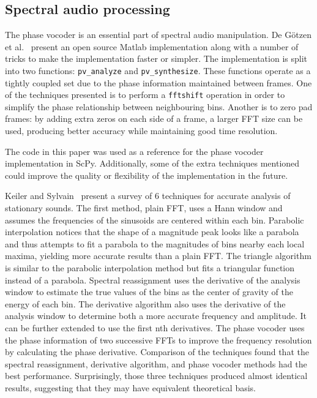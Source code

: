 \documentclass{article}
\begin{document}
\subsection{Spectral audio processing}

The phase vocoder is an essential part of spectral audio manipulation. De G{\"o}tzen et
al.~\cite{de2000traditional} present an open source Matlab implementation along with a number of
tricks to make the implementation faster or simpler. The implementation is split into two
functions: \texttt{pv\_analyze} and \texttt{pv\_synthesize}. These functions operate as a tightly
coupled set due to the phase information maintained between frames. One of the techniques presented
is to perform a \texttt{fftshift} operation in order to simplify the phase relationship between
neighbouring bins. Another is to zero pad frames: by adding extra zeros on each side of a frame, a
larger FFT size can be used, producing better accuracy while maintaining good time resolution.

The code in this paper was used as a reference for the phase vocoder implementation in ScPy.
Additionally, some of the extra techniques mentioned could improve the quality or flexibility of
the implementation in the future.

Keiler and Sylvain~\cite{keiler2002survey} present a survey of 6 techniques for accurate analysis
of stationary sounds. The first method, plain FFT, uses a Hann window and assumes the frequencies
of the sinusoids are centered within each bin. Parabolic interpolation notices that the shape of a
magnitude peak looks like a parabola and thus attempts to fit a parabola to the magnitudes of bins
nearby each local maxima, yielding more accurate results than a plain FFT\@. The triangle algorithm
is similar to the parabolic interpolation method but fits a triangular function instead of a
parabola. Spectral reassignment uses the derivative of the analysis window to estimate the true
values of the bins as the center of gravity of the energy of each bin. The derivative algorithm
also uses the derivative of the analysis window to determine both a more accurate frequency and
amplitude. It can be further extended to use the first nth derivatives. The phase vocoder uses the
phase information of two successive FFTs to improve the frequency resolution by calculating the
phase derivative. Comparison of the techniques found that the spectral reassignment, derivative
algorithm, and phase vocoder methods had the best performance. Surprisingly, those three techniques
produced almost identical results, suggesting that they may have equivalent theoretical basis.
\end{document}
